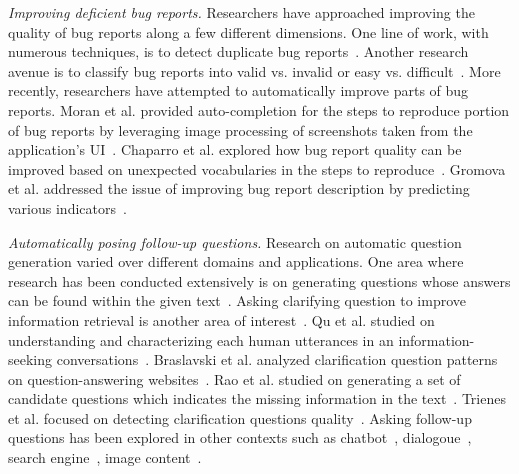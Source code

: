 \noindent
{\em Improving deficient bug reports.} Researchers have approached improving the quality of bug reports along a few different dimensions. One line of work, with numerous techniques, is to detect duplicate bug reports~\cite{chaparro19reformulating}. Another research avenue is to classify bug reports into valid vs. invalid or easy vs. difficult~\cite{fan20chaff,hooimeijer07modeling}. More recently, researchers have attempted to automatically improve parts of bug reports. Moran et al. provided auto-completion for the steps to reproduce portion of bug reports by leveraging image processing of screenshots taken from the application's UI~\cite{moran15autocompleting}.  Chaparro et al. explored how bug report quality can be improved based on unexpected vocabularies in the steps to reproduce~\cite{Chaparro2019AssessingTQ}.  Gromova et al. addressed the issue of improving bug report description by predicting various indicators~\cite{gromova2019raising}.

\noindent
{\em Automatically posing follow-up questions.} Research on automatic question generation varied over different domains and applications. One area where research has been conducted extensively is on generating questions whose answers can be found within the given text~\cite{vanderwende2008importance, rus2011question, zhou2017neural, heilman2010good, duan2017question,  du2017learning}. Asking clarifying question to improve information retrieval is another area of interest~\cite{10.1145/3366423.3380126, 10.1145/3331184.3331265, stoyanchev2014towards}.  Qu et al. studied on understanding and characterizing each human utterances in an information-seeking conversations~\cite{10.1145/3209978.3210124}. Braslavski et al. analyzed clarification question patterns on question-answering websites~\cite{10.1145/3020165.3022149}. Rao et al. studied on generating a set of candidate questions which indicates the missing information in the text~\cite{rao-daume-iii-2018-learning}. Trienes et al. focused on detecting clarification questions quality~\cite{trienes2019identifying}. Asking follow-up questions has been explored in other contexts such as chatbot~\cite{Hancock2019LearningFD}, dialogoue~\cite{de2005implementing, de2003analysis}, search engine~\cite{Ren2020ConversationsWS}, image content~\cite{Mostafazadeh_2016}.

